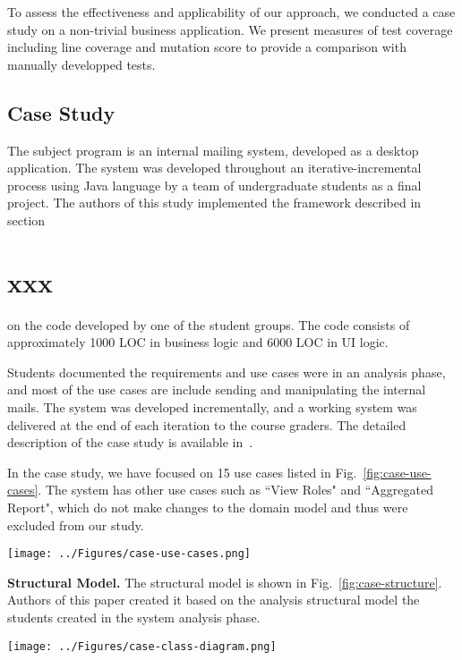 %
%
\label{sec:evaluation}
To assess the effectiveness and applicability of our approach, we conducted a case study on a non-trivial business application. We present measures of test coverage including line coverage and mutation score to provide a comparison with manually developped tests. 


\subsection{Case Study}
\label{sec:evaluation-case-study}
The subject program is an internal mailing system, developed as a desktop application. The system was developed throughout an iterative-incremental process using Java language by a team of undergraduate students as a final project. The authors of this study implemented the framework described in section~\section{xxx} on the code developed by one of the student groups.
The code consists of approximately 1000 LOC in business logic and 6000 LOC in UI logic.

Students documented the requirements and use cases were in an analysis phase, and most of the use cases are include sending and manipulating the internal mails. The system was developed incrementally, and a working system was delivered at the end of each iteration to the course graders.
The detailed description of the case study is available in~\cite{Jalalinasab2012b}. 

In the case study, we have focused on 15 use cases listed in Fig.~\ref{fig:case-use-cases}. The system has other use cases such as ``View Roles" and ``Aggregated Report", which do not make changes to the domain model and thus were excluded from our study. 

\begin{figure*}[h]
\centering
\texttt{[image: ../Figures/case-use-cases.png]}
\caption{Use case diagram for the case study.}
\label{fig:case-use-cases}
\end{figure*}

\textbf{Structural Model.} The structural model is shown in Fig.~\ref{fig:case-structure}. Authors of this paper created it based on the analysis structural model the students created in the system analysis phase.

\begin{figure*}[!t]
\centering
\texttt{[image: ../Figures/case-class-diagram.png]}%
\caption{Structural model of the case study.}
\label{fig:case-structure}
\end{figure*} 

